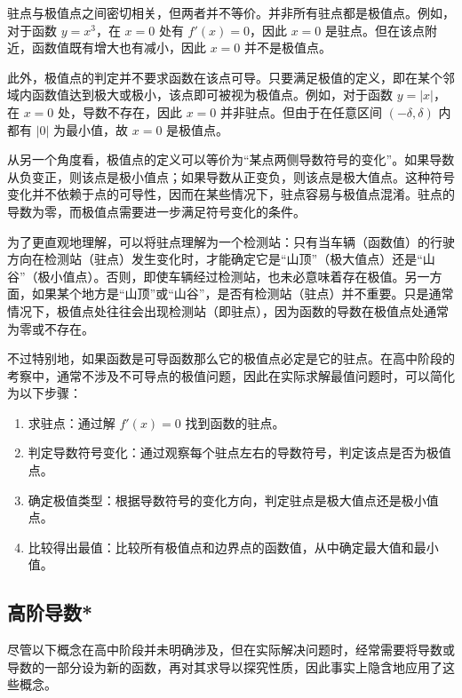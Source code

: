 驻点与极值点之间密切相关，但两者并不等价。并非所有驻点都是极值点。例如，对于函数 $y = x^3$，在 $x = 0$ 处有 $f'(x) = 0$，因此 $x = 0$ 是驻点。但在该点附近，函数值既有增大也有减小，因此 $x = 0$ 并不是极值点。

此外，极值点的判定并不要求函数在该点可导。只要满足极值的定义，即在某个邻域内函数值达到极大或极小，该点即可被视为极值点。例如，对于函数 $y = |x|$，在 $x = 0$ 处，导数不存在，因此 $x = 0$ 并非驻点。但由于在任意区间 $(-\delta, \delta)$ 内都有 $|0|$ 为最小值，故 $x = 0$ 是极值点。

从另一个角度看，极值点的定义可以等价为“某点两侧导数符号的变化”。如果导数从负变正，则该点是极小值点；如果导数从正变负，则该点是极大值点。这种符号变化并不依赖于点的可导性，因而在某些情况下，驻点容易与极值点混淆。驻点的导数为零，而极值点需要进一步满足符号变化的条件。

为了更直观地理解，可以将驻点理解为一个检测站：只有当车辆（函数值）的行驶方向在检测站（驻点）发生变化时，才能确定它是“山顶”（极大值点）还是“山谷”（极小值点）。否则，即使车辆经过检测站，也未必意味着存在极值。另一方面，如果某个地方是“山顶”或“山谷”，是否有检测站（驻点）并不重要。只是通常情况下，极值点处往往会出现检测站（即驻点），因为函数的导数在极值点处通常为零或不存在。

不过特别地，如果函数是可导函数那么它的极值点必定是它的驻点。在高中阶段的考察中，通常不涉及不可导点的极值问题，因此在实际求解最值问题时，可以简化为以下步骤：

\begin{enumerate}
\item 求驻点：通过解 $f'(x) = 0$ 找到函数的驻点。
\item 判定导数符号变化：通过观察每个驻点左右的导数符号，判定该点是否为极值点。
\item 确定极值类型：根据导数符号的变化方向，判定驻点是极大值点还是极小值点。
\item 比较得出最值：比较所有极值点和边界点的函数值，从中确定最大值和最小值。
\end{enumerate}

\subsection{高阶导数*}


尽管以下概念在高中阶段并未明确涉及，但在实际解决问题时，经常需要将导数或导数的一部分设为新的函数，再对其求导以探究性质，因此事实上隐含地应用了这些概念。

